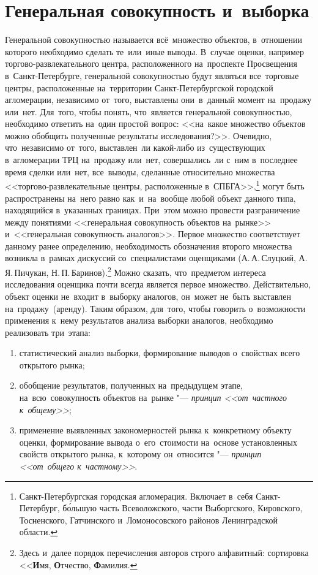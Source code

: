\documentclass[]{scrartcl}
\begin{document}
\section{Генеральная совокупность и~выборка}
Генеральной совокупностью называется всё~множество объектов, в~отношении которого необходимо сделать те~или~иные выводы. В~случае оценки, например торгово-развлекательного центра, расположенного на~проспекте Просвещения в~Санкт-Петербурге, генеральной совокупностью будут являться все~торговые центры, расположенные на~территории Санкт-Петербургской городской агломерации, независимо от~того, выставлены они~в~данный момент на~продажу или~нет. Для~того, чтобы понять, что~является генеральной совокупностью, необходимо ответить на~один простой вопрос: <<на~какое множество объектов можно обобщить полученные результаты исследования?>>. Очевидно, что~независимо от~того, выставлен~ли какой-либо из~существующих в~агломерации ТРЦ на~продажу или~нет, совершались~ли с~ним в~последнее время сделки или~нет, все~выводы, сделанные относительно множества <<торгово-развлекательные центры, расположенные в~СПБГА>>,\footnote{Санкт-Петербургская городская агломерация. Включает в~себя Санкт-Петербург, б\'ольшую часть Всеволожского, части Выборгского, Кировского, Тосненского, Гатчинского и~Ломоносовского районов Ленинградской области.} могут быть распространены на~него равно как~и~на~вообще любой объект данного типа, находящийся в~указанных границах. При~этом можно провести разграничение между понятиями <<генеральная совокупность объектов на~рынке>> и~<<генеральная совокупность аналогов>>. Первое множество соответствует данному ранее определению, необходимость обозначения второго множества возникла в~рамках дискуссий со~специалистами оценщиками (А.\,А.\,Слуцкий, А.\,Я.\,Пичукан, Н.\,П.\,Баринов).\footnote{Здесь и~далее порядок перечисления авторов строго алфавитный: сортировка <<\textbf{И}мя, \textbf{О}тчество, \textbf{Ф}амилия.} Можно сказать, что~предметом интереса исследования оценщика почти всегда является первое множество. Действительно, объект оценки не~входит в~выборку аналогов, он~может не~быть выставлен на~продажу~(аренду). Таким образом, для~того, чтобы говорить о~возможности применения к~нему результатов анализа выборки аналогов, необходимо реализовать три~этапа:
	\begin{enumerate}
		\item статистический анализ выборки, формирование выводов о~свойствах всего открытого рынка;
		\item обобщение результатов, полученных на~предыдущем этапе, на~всю~совокупность объектов на~рынке "--- \emph{принцип <<от~частного к~общему>>};
		\item применение выявленных закономерностей рынка к~конкретному объекту оценки, формирование вывода о~его~стоимости на~основе установленных свойств открытого рынка, к~которому он~относится "--- \emph{принцип <<от~общего к~частному>>}.
	\end{enumerate}
\end{document}
